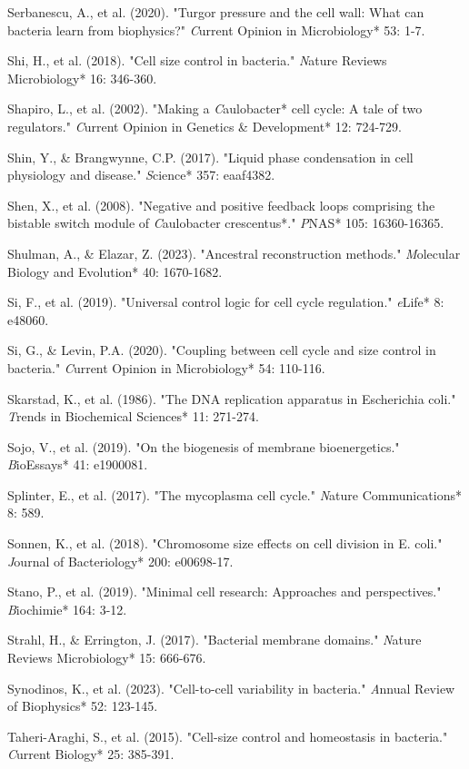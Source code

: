 \documentclass[11pt,a4paper]{article}
\begin{document}
Serbanescu, A., et al. (2020). "Turgor pressure and the cell wall: What can bacteria learn from biophysics?" \textit*Current Opinion in Microbiology* 53: 1-7.

Shi, H., et al. (2018). "Cell size control in bacteria." \textit*Nature Reviews Microbiology* 16: 346-360.

Shapiro, L., et al. (2002). "Making a \textit*Caulobacter* cell cycle: A tale of two regulators." \textit*Current Opinion in Genetics & Development* 12: 724-729.

Shin, Y., & Brangwynne, C.P. (2017). "Liquid phase condensation in cell physiology and disease." \textit*Science* 357: eaaf4382.

Shen, X., et al. (2008). "Negative and positive feedback loops comprising the bistable switch module of \textit*Caulobacter crescentus*." \textit*PNAS* 105: 16360-16365.

Shulman, A., & Elazar, Z. (2023). "Ancestral reconstruction methods." \textit*Molecular Biology and Evolution* 40: 1670-1682.

Si, F., et al. (2019). "Universal control logic for cell cycle regulation." \textit*eLife* 8: e48060.

Si, G., & Levin, P.A. (2020). "Coupling between cell cycle and size control in bacteria." \textit*Current Opinion in Microbiology* 54: 110-116.

Skarstad, K., et al. (1986). "The DNA replication apparatus in Escherichia coli." \textit*Trends in Biochemical Sciences* 11: 271-274.

Sojo, V., et al. (2019). "On the biogenesis of membrane bioenergetics." \textit*BioEssays* 41: e1900081.

Splinter, E., et al. (2017). "The mycoplasma cell cycle." \textit*Nature Communications* 8: 589.

Sonnen, K., et al. (2018). "Chromosome size effects on cell division in E. coli." \textit*Journal of Bacteriology* 200: e00698-17.

Stano, P., et al. (2019). "Minimal cell research: Approaches and perspectives." \textit*Biochimie* 164: 3-12.

Strahl, H., & Errington, J. (2017). "Bacterial membrane domains." \textit*Nature Reviews Microbiology* 15: 666-676.

Synodinos, K., et al. (2023). "Cell-to-cell variability in bacteria." \textit*Annual Review of Biophysics* 52: 123-145.

Taheri-Araghi, S., et al. (2015). "Cell-size control and homeostasis in bacteria." \textit*Current Biology* 25: 385-391.
\end{document}
